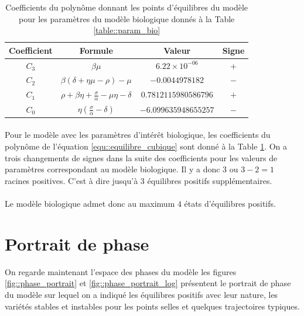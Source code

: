 \documentclass[12pt]{article}
\begin{document}
\begin{table}[h]
    \centering
    \renewcommand{\arraystretch}{1.5}
    \begin{tabular}{c|c|c|c}
    \hline
    Coefficient & Formule & Valeur & Signe\\
    \hline
         $C_3$ & $\beta\mu$ & $6.22\times 10^{-06}$ & $+$\\
    
         $C_2$ & $\beta(\delta+\eta\mu-\rho)- \mu$ & $-0.0044978182$ & $-$\\
    
         $C_1$ & $\rho+\beta\eta+\frac{\sigma}{\alpha}- \mu\eta - \delta$ & $0.7812115980586796$& $+$\\
    
         $C_0$ & $\eta \left(\frac{\sigma}{\alpha} - \delta\right)$ & $-6.099635948655257$ & $-$\\
    \hline
    \end{tabular}
    \caption{Coefficients du polynôme donnant les points d'équilibres du modèle pour les paramètres du modèle biologique donnés à la Table \ref{table::param_bio}}
    \label{table::coeff}
\end{table} 

\paragraph{}
Pour le modèle avec les paramètres d'intérêt biologique, les coefficients du polynôme de l'équation \ref{equ::equilibre_cubique} sont donné à la Table \ref{table::coeff}. On a trois changements de signes dans la suite des coefficients pour les valeurs de paramètres correspondant au modèle biologique. Il y a donc 3 ou $3 - 2 = 1$ racines positives. C'est à dire jusqu'à 3 équilibres positifs supplémentaires.

\paragraph{}
Le modèle biologique admet donc au maximum $4$ états d'équilibres positifs. 

\section{Portrait de phase}
On regarde maintenant l'espace des phases du modèle les figures \ref{fig::phase_portrait} et \ref{fig::phase_portrait_log} présentent le portrait de phase du modèle sur lequel on a indiqué les équilibres positifs avec leur nature, les variétés stables et instables pour les points selles et quelques trajectoires typiques.
\end{document}
